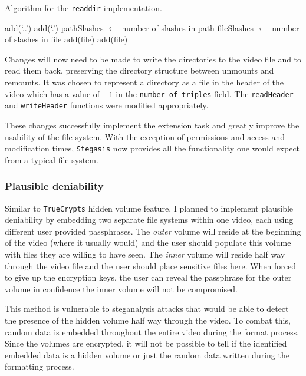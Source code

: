 \documentclass[paper=a4, fontsize=11pt,twoside]{scrartcl}
\numberwithin{table}{section}
\numberwithin{figure}{section}
\numberwithin{algorithm}{section}
\begin{document}
\begin{algorithm}
\caption{Algorithm for the \texttt{readdir} implementation.}
\label{dirs}
\begin{algorithmic}[1]
\State add(`..')
\State add(`.')
\State pathSlashes $\gets$ number of slashes in path
	\State fileSlashes $\gets$ number of slashes in file
			\State add(file)
		\EndIf
		\State add(file)
	\EndIf
\EndFor
\end{algorithmic}
\end{algorithm}

Changes will now need to be made to write the directories to the video file and to read them back, preserving the directory structure between unmounts and remounts. It was chosen to represent a directory as a file in the header of the video which has a value of $-1$ in the \texttt{number of triples} field. The \texttt{readHeader} and \texttt{writeHeader} functions were modified appropriately.

These changes successfully implement the extension task and greatly improve the usability of the file system. With the exception of permissions and access and modification times, \texttt{Stegasis} now provides all the functionality one would expect from a typical file system.


\subsubsection{Plausible deniability}

Similar to \texttt{TrueCrypts} hidden volume feature, I planned to implement plausible deniability by embedding two separate file systems within one video, each using different user provided passphrases. The \textit{outer} volume will reside at the beginning of the video (where it usually would) and the user should populate this volume with files they are willing to have seen. The \textit{inner} volume will reside half way through the video file and the user should place sensitive files here. When forced to give up the encryption keys, the user can reveal the passphrase for the outer volume in confidence the inner volume will not be compromised.

This method is vulnerable to steganalysis attacks that would be able to detect the presence of the hidden volume half way through the video. To combat this, random data is embedded throughout the entire video during the format process. Since the volumes are encrypted, it will not be possible to tell if the identified embedded data is a hidden volume or just the random data written during the formatting process.
\end{document}
